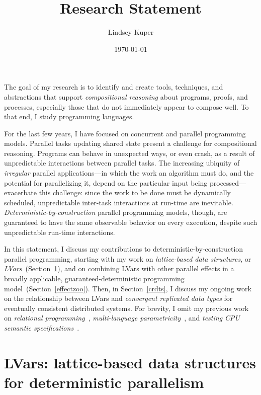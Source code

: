 \documentclass{article}
\def\name{Lindsey Kuper}
\begin{document}
\title{Research Statement}

\author{\name}

\date{\today}

\maketitle

\noindent 
The goal of my research is to identify and create tools, techniques,
and abstractions that support \emph{compositional reasoning} about
programs, proofs, and processes, especially those that do not
immediately appear to compose well.  To that end, I study programming
languages.

For the last few years, I have focused on concurrent and parallel
programming models.  Parallel tasks updating shared state present a
challenge for compositional reasoning. Programs can behave in
unexpected ways, or even crash, as a result of unpredictable
interactions between parallel tasks.  The increasing ubiquity of
\emph{irregular} parallel applications---in which the work an
algorithm must do, and the potential for parallelizing it, depend on
the particular input being processed---exacerbate this challenge:
since the work to be done must be dynamically scheduled, unpredictable
inter-task interactions at run-time are inevitable.
\emph{Deterministic-by-construction} parallel programming models,
though, are guaranteed to have the same observable behavior on every
execution, despite such unpredictable run-time interactions.

In this statement, I discuss my contributions to
deterministic-by-construction parallel programming, starting with my
work on \emph{lattice-based data structures}, or
\emph{LVars}~(Section~\ref{lvars}), and on combining LVars with other
parallel effects in a broadly applicable, guaranteed-deterministic
programming model~(Section~\ref{effectzoo}).  Then, in
Section~\ref{crdts}, I discuss my ongoing work on the relationship
between LVars and \emph{convergent replicated data types} for
eventually consistent distributed systems.  For brevity, I omit my
previous work on \emph{relational programming}~\cite{lambdae},
\emph{multi-language parametricity}~\cite{multilang-talk}, and
\emph{testing CPU semantic specifications}~\cite{tsl-tr}.

\section{LVars: lattice-based data structures for deterministic parallelism}\label{lvars}
\end{document}
